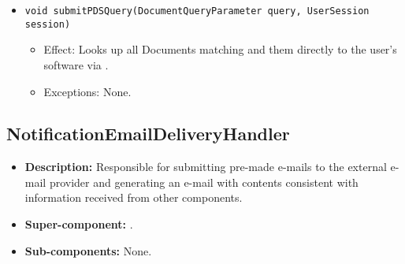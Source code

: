 \begin{itemize}
\begin{itemize}
		\item \texttt{void submitPDSQuery(DocumentQueryParameter query, UserSession session)}
        \begin{itemize}
            \item Effect: Looks up all Documents matching  and them directly to the user's software via .
            \item Exceptions: None.
        \end{itemize}
    \end{itemize}
\end{itemize}

\subsection{NotificationEmailDeliveryHandler}
\begin{itemize}
    \item \textbf{Description:} Responsible for submitting pre-made e-mails to the external e-mail provider and generating an e-mail with contents consistent with information received from other components.
    \item \textbf{Super-component:} .
    \item \textbf{Sub-components:} None.
\end{itemize}

